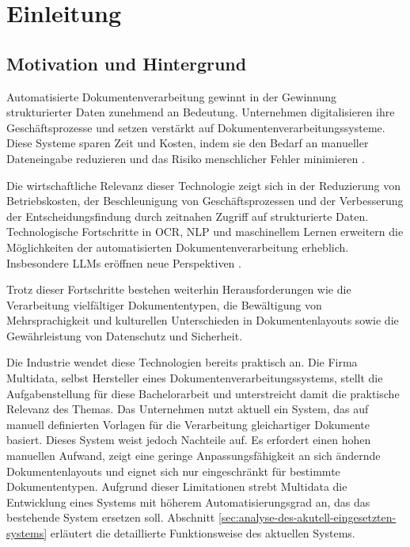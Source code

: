 \chapter{Einleitung}
\label{cha:einleitung}

\section{Motivation und Hintergrund}
\label{sec:motivation-und-hintergrund}

Automatisierte Dokumentenverarbeitung gewinnt in der Gewinnung strukturierter Daten zunehmend an Bedeutung. Unternehmen digitalisieren ihre Geschäftsprozesse und setzen verstärkt auf Dokumentenverarbeitungssysteme. Diese Systeme sparen Zeit und Kosten, indem sie den Bedarf an manueller Dateneingabe reduzieren und das Risiko menschlicher Fehler minimieren \parencite{PerotVincent2024LLMD}.

Die wirtschaftliche Relevanz dieser Technologie zeigt sich in der Reduzierung von Betriebskosten, der Beschleunigung von Geschäftsprozessen und der Verbesserung der Entscheidungsfindung durch zeitnahen Zugriff auf strukturierte Daten. Technologische Fortschritte in \gls{OCR}, \gls{NLP} und maschinellem Lernen erweitern die Möglichkeiten der automatisierten Dokumentenverarbeitung erheblich. Insbesondere \glspl{LLM} eröffnen neue Perspektiven \parencite{XuYiheng2020LPoT, TouvronHugo2023LOaE}.

Trotz dieser Fortschritte bestehen weiterhin Herausforderungen wie die Verarbeitung vielfältiger Dokumententypen, die Bewältigung von Mehrsprachigkeit und kulturellen Unterschieden in Dokumentenlayouts sowie die Gewährleistung von Datenschutz und Sicherheit.

Die Industrie wendet diese Technologien bereits praktisch an. Die Firma Multidata, selbst Hersteller eines Dokumentenverarbeitungssystems, stellt die Aufgabenstellung für diese Bachelorarbeit und unterstreicht damit die praktische Relevanz des Themas.
Das Unternehmen nutzt aktuell ein System, das auf manuell definierten Vorlagen für die Verarbeitung gleichartiger Dokumente basiert. Dieses System weist jedoch Nachteile auf. Es erfordert einen hohen manuellen Aufwand, zeigt eine geringe Anpassungsfähigkeit an sich ändernde Dokumentenlayouts und eignet sich nur eingeschränkt für bestimmte Dokumententypen.
Aufgrund dieser Limitationen strebt Multidata die Entwicklung eines Systems mit höherem Automatisierungsgrad an, das das bestehende System ersetzen soll. Abschnitt \ref{sec:analyse-des-akutell-eingesetzten-systems} erläutert die detaillierte Funktionsweise des aktuellen Systems.

